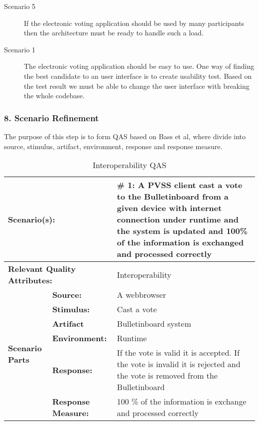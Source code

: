\begin{description}
     \item [Scenario 5]
        If the electronic voting application should be used by many participants then the architecture must be ready to handle such a load. 
        
    \item [Scenario 1]
        The electronic voting application should be easy to use. One way of finding the best candidate to an user interface is to create usability test. Based on the test result we must be able to change the user interface with breaking the whole codebase. 
  \end{description}


\subsubsection{8. Scenario Refinement}
The purpose of this step is to form QAS based on Bass et al, where divide into source, stimulus, artifact, environment, response and response measure. 


\begin{table}[H]
\begin{center}
\begin{tabular}{|p{0.3cm}|p{2.5cm}|p{8cm}|}
  \hline
  \multicolumn{2}{|p{3cm}|}{\bfseries Scenario(s):} & \#  1: A PVSS client cast a vote to the Bulletinboard from a given device with internet connection  under runtime and the system is updated and 100\% of the information is exchanged  and processed correctly\\
  \hline
  \multicolumn{2}{|p{3cm}|}{\bfseries Relevant Quality Attributes:} & Interoperability\\
  \hline
  \multirow{6}{*}{\begin{sideways}{\bfseries Scenario Parts}\end{sideways}}
  & {\bfseries Source:} & A webbrowser \\
  \cline{2-3}
  & {\bfseries Stimulus:} & Cast a vote \\
  \cline{2-3}
  & {\bfseries Artifact} &  Bulletinboard system \\
  \cline{2-3}
  & {\bfseries Environment:} &  Runtime \\
  \cline{2-3}
  & {\bfseries Response:} &  If the vote is valid it is accepted. If the vote is invalid it is rejected and the vote is removed from the Bulletinboard \\
  \cline{2-3}
  & {\bfseries Response Measure:} & 100 \% of the information is exchange and processed correctly \\
  \hline
\end{tabular}
\caption{Interoperability QAS}
\end{center}
\end{table}


